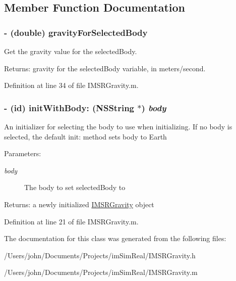 \subsection{Member Function Documentation}
\hypertarget{interface_i_m_s_r_gravity_98e01aca71f1f3c91a769b2bb8571ff5}{
\subsubsection[{gravityForSelectedBody}]{\setlength{\rightskip}{0pt plus 5cm}- (double) gravityForSelectedBody }}
\label{interface_i_m_s_r_gravity_98e01aca71f1f3c91a769b2bb8571ff5}


Get the gravity value for the selectedBody.

\begin{Desc}
\item[Returns:]gravity for the selectedBody variable, in meters/second. \end{Desc}


Definition at line 34 of file IMSRGravity.m.\hypertarget{interface_i_m_s_r_gravity_8b103c80cb67a994c8bcaefe0aca3b4f}{
\subsubsection[{initWithBody:}]{\setlength{\rightskip}{0pt plus 5cm}- (id) initWithBody: (NSString $\ast$) {\em body}}}
\label{interface_i_m_s_r_gravity_8b103c80cb67a994c8bcaefe0aca3b4f}


An initializer for selecting the body to use when initializing. If no body is selected, the default init: method sets body to Earth

\begin{Desc}
\item[Parameters:]
\begin{description}
\item[{\em body}]The body to set selectedBody to\end{description}
\end{Desc}
\begin{Desc}
\item[Returns:]a newly initialized \hyperlink{interface_i_m_s_r_gravity}{IMSRGravity} object \end{Desc}


Definition at line 21 of file IMSRGravity.m.

The documentation for this class was generated from the following files:\begin{CompactItemize}
\item 
/Users/john/Documents/Projects/imSimReal/IMSRGravity.h\item 
/Users/john/Documents/Projects/imSimReal/IMSRGravity.m\end{CompactItemize}
